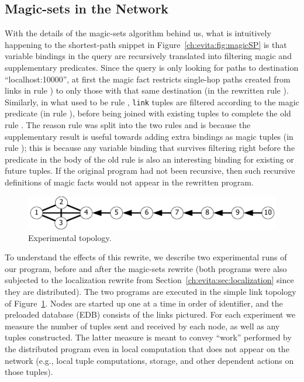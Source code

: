 \subsection{Magic-sets in the Network}

With the details of the magic-sets algorithm behind us, what is
intuitively happening to the shortest-path snippet in
Figure~\ref{ch:evita:fig:magicSP} is that variable bindings in the query are
recursively translated into filtering magic and supplementary
predicates. Since the query is only looking for paths to
destination ``localhost:10000'', at first the magic fact restricts single-hop
paths created from links in rule ) to only those with that same 
destination (in the rewritten rule ). Similarly, in what used to 
be rule , {\tt link} tuples are filtered according to the magic predicate (in rule
), before being joined with existing  tuples to
complete the old rule . The reason rule  was split into
the two rules  and  is because the
supplementary result  is useful towards adding extra bindings as
magic tuples (in rule ); this is because any variable
binding that survives filtering right before the 
predicate in the body of the old rule  is also an interesting
binding for existing or future  tuples. If the original
program had not been recursive, then such recursive definitions of magic
facts would not appear in the rewritten program.

\begin{figure}
\centering
\includegraphics[scale=1.2]{figures/Topology}
\caption{Experimental topology.}
\label{ch:evita:fig:topo}
\end{figure}

To understand the effects of this rewrite, we describe two experimental
runs of our program, before and after the magic-sets rewrite (both
programs were also subjected to the localization rewrite from
Section~\ref{ch:evita:sec:localization} since they are distributed).  The two
programs are executed in the simple link topology of
Figure~\ref{ch:evita:fig:topo}. Nodes are started up one at a time in order of
identifier, and the preloaded database (EDB) consists of the links pictured. For each experiment we measure the number of
tuples sent and received by each node, as well as any 
tuples constructed. The latter measure is meant to convey ``work''
performed by the distributed program even in local computation that does
not appear on the network (e.g., local tuple computations, storage, and
other dependent actions on those tuples).

